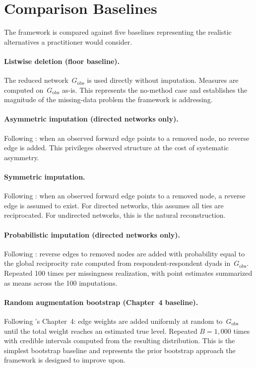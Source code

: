 \documentclass[11pt]{article}
\newcommand{\Gobs}{G_{\text{obs}}}
\begin{document}
\section{Comparison Baselines}

The framework is compared against five baselines representing the realistic alternatives a practitioner would consider.

\paragraph{Listwise deletion (floor baseline).} The reduced network~$\Gobs$ is used directly without imputation. Measures are computed on~$\Gobs$ as-is. This represents the no-method case and establishes the magnitude of the missing-data problem the framework is addressing.

\paragraph{Asymmetric imputation (directed networks only).} Following \citet{SmithMorganMoody2022}: when an observed forward edge points to a removed node, no reverse edge is added. This privileges observed structure at the cost of systematic asymmetry.

\paragraph{Symmetric imputation.} Following \citet{SmithMorganMoody2022}: when an observed forward edge points to a removed node, a reverse edge is assumed to exist. For directed networks, this assumes all ties are reciprocated. For undirected networks, this is the natural reconstruction.

\paragraph{Probabilistic imputation (directed networks only).} Following \citet{SmithMorganMoody2022}: reverse edges to removed nodes are added with probability equal to the global reciprocity rate computed from respondent-respondent dyads in~$\Gobs$. Repeated 100 times per missingness realization, with point estimates summarized as means across the 100 imputations.

\paragraph{Random augmentation bootstrap (Chapter~4 baseline).} Following \citet{Bellutta2026}'s Chapter~4: edge weights are added uniformly at random to~$\Gobs$ until the total weight reaches an estimated true level. Repeated $B = 1{,}000$ times with credible intervals computed from the resulting distribution. This is the simplest bootstrap baseline and represents the prior bootstrap approach the framework is designed to improve upon.
\end{document}
